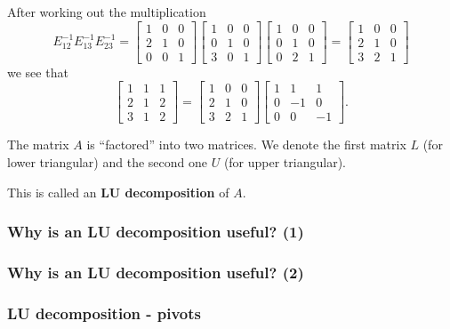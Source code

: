 \begin{frame}
After working out the multiplication
\[
E_{12}^{-1}E_{13}^{-1}E_{23}^{-1} =
\begin{bmatrix}
  1 & 0 & 0 \\
  2 & 1 & 0 \\
  0 & 0 & 1
\end{bmatrix}
\begin{bmatrix}
  1 & 0 & 0 \\
  0 & 1 & 0 \\
  3 & 0 & 1
\end{bmatrix}
\begin{bmatrix}
  1 & 0 & 0 \\
  0 & 1 & 0 \\
  0 & 2 & 1
\end{bmatrix}
=
\begin{bmatrix}
  1 & 0 & 0 \\
  2 & 1 & 0 \\
  3 & 2 & 1
\end{bmatrix}
\]
we see that
\[
\begin{bmatrix}
  1 & 1 & 1 \\
  2 & 1 & 2 \\
  3 & 1 & 2
\end{bmatrix}
=
\begin{bmatrix}
  1 & 0 & 0 \\
  2 & 1 & 0 \\
  3 & 2 & 1
\end{bmatrix}
\begin{bmatrix}
  1 & 1 & 1 \\
  0 & -1 & 0 \\
  0 & 0 & -1
\end{bmatrix}.
\]

The matrix $A$ is ``factored'' into two matrices.  We denote the first
matrix $L$ (for lower triangular) and the second one $U$ (for upper
triangular).

This is called an {\bf LU decomposition} of $A$.

\end{frame}

\begin{frame}
  \frametitle{Why is an LU decomposition useful? (1)}
\end{frame}

\begin{frame}
  \frametitle{Why is an LU decomposition useful? (2)}
\end{frame}

\begin{frame}
  \frametitle{LU decomposition - pivots}
\end{frame}
